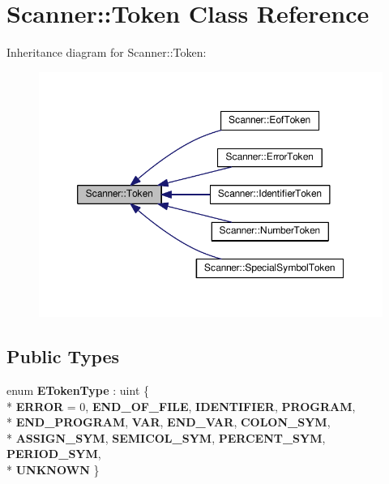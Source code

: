 \hypertarget{class_scanner_1_1_token}{}\section{Scanner\+:\+:Token Class Reference}
\label{class_scanner_1_1_token}


Inheritance diagram for Scanner\+:\+:Token\+:
\nopagebreak
\begin{figure}[H]
\begin{center}
\leavevmode
\includegraphics[width=350pt]{class_scanner_1_1_token__inherit__graph}
\end{center}
\end{figure}
\subsection*{Public Types}
\begin{DoxyCompactItemize}
\item 
enum {\bfseries E\+Token\+Type} \+: uint \{ \\*
{\bfseries E\+R\+R\+OR} = 0, 
{\bfseries E\+N\+D\+\_\+\+O\+F\+\_\+\+F\+I\+LE}, 
{\bfseries I\+D\+E\+N\+T\+I\+F\+I\+ER}, 
{\bfseries P\+R\+O\+G\+R\+AM}, 
\\*
{\bfseries E\+N\+D\+\_\+\+P\+R\+O\+G\+R\+AM}, 
{\bfseries V\+AR}, 
{\bfseries E\+N\+D\+\_\+\+V\+AR}, 
{\bfseries C\+O\+L\+O\+N\+\_\+\+S\+YM}, 
\\*
{\bfseries A\+S\+S\+I\+G\+N\+\_\+\+S\+YM}, 
{\bfseries S\+E\+M\+I\+C\+O\+L\+\_\+\+S\+YM}, 
{\bfseries P\+E\+R\+C\+E\+N\+T\+\_\+\+S\+YM}, 
{\bfseries P\+E\+R\+I\+O\+D\+\_\+\+S\+YM}, 
\\*
{\bfseries U\+N\+K\+N\+O\+WN}
 \}\hypertarget{class_scanner_1_1_token_adba36ae34c8f4befddcbc76c761cc244}{}\label{class_scanner_1_1_token_adba36ae34c8f4befddcbc76c761cc244}

\end{DoxyCompactItemize}
